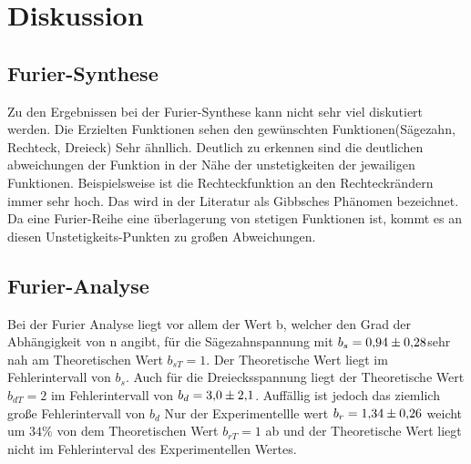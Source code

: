\section{Diskussion}
\label{sec:Diskussion}
\subsection{Furier-Synthese}
Zu den Ergebnissen bei der Furier-Synthese kann nicht sehr viel diskutiert werden. 
Die Erzielten Funktionen sehen den gewünschten Funktionen(Sägezahn, Rechteck, Dreieck)
Sehr ähnllich. Deutlich zu erkennen sind die deutlichen abweichungen der Funktion in der Nähe der 
unstetigkeiten der jewailigen Funktionen. Beispielsweise ist die Rechteckfunktion an den Rechteckrändern immer sehr hoch.
Das wird in der Literatur als Gibbsches Phänomen bezeichnet. Da eine Furier-Reihe eine überlagerung von stetigen Funktionen 
ist, kommt es an diesen Unstetigkeits-Punkten zu großen Abweichungen.

\subsection{Furier-Analyse}
Bei der Furier Analyse liegt vor allem der Wert b, welcher den Grad der 
Abhängigkeit von n angibt, für die Sägezahnspannung mit $b_s = \num{0.94+-0.28} $sehr nah am
Theoretischen Wert $b_{sT} = 1$. Der Theoretische Wert liegt im Fehlerintervall von $b_s$. Auch für die Dreiecksspannung 
liegt der Theoretische Wert $b_{dT} = 2$ im Fehlerintervall von $b_d = \num{3.0+-2.1}$. Auffällig ist jedoch das ziemlich große Fehlerintervall von $b_d$
Nur der Experimentellle wert $b_r = \num{1.34+-0.26}$ weicht um $34 \% $ von dem Theoretischen Wert $b_{rT} = 1$ ab und der Theoretische Wert liegt nicht im
 Fehlerinterval des Experimentellen Wertes. 